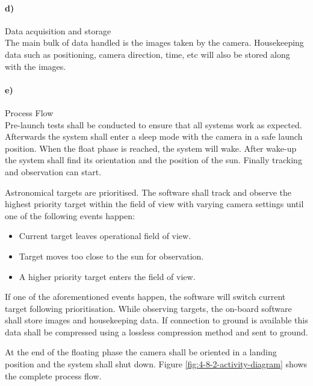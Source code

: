 \paragraph{d)} Data acquisition and storage\\

The main bulk of data handled is the images taken by the camera. Housekeeping data such as positioning, camera direction, time, etc will also be stored along with the images.



\paragraph{e)} Process Flow\\

Pre-launch tests shall be conducted to ensure that all systems work as expected. Afterwards the system shall enter a sleep mode with the camera in a safe launch position. When the float phase is reached, the system will wake. After wake-up the system shall find its orientation and the position of the sun. Finally tracking and observation can start.

Astronomical targets are prioritised. The software shall track and observe the highest priority target within the field of view with varying camera settings until one of the following events happen:

\begin{itemize}
	\item Current target leaves operational field of view.
	\item Target moves too close to the sun for observation.
	\item A higher priority target enters the field of view.
\end{itemize}

If one of the aforementioned events happen, the software will switch current target following prioritisation. While observing targets, the on-board software shall store images and housekeeping data. If connection to ground is available this data shall be compressed using a lossless compression method and sent to ground.

At the end of the floating phase the camera shall be oriented in a landing position and the system shall shut down. Figure \ref{fig:4-8-2-activity-diagram} shows the complete process flow.

